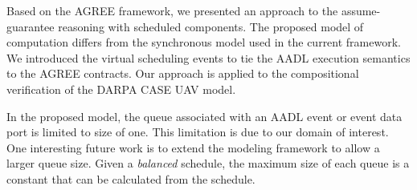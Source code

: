 Based on the AGREE framework, we presented an approach to the assume-guarantee reasoning with scheduled components. The proposed model of computation differs from the synchronous model used in the current framework. We introduced the virtual scheduling events to tie the AADL execution semantics to the AGREE contracts. Our approach is applied to the compositional verification of the DARPA CASE UAV model.

In the proposed model, the queue associated with an AADL event or event data port is limited to size of one. This limitation is due to our domain of interest. One interesting future work is to extend the modeling framework to allow a larger queue size. Given a \emph{balanced} schedule, the maximum size of each queue is a constant that can be calculated from the schedule.
